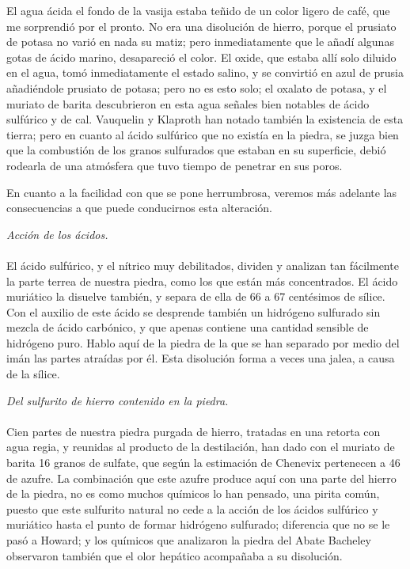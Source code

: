\documentclass[a4paper, 11pt, oneside, polutonikogreek, spanish]{article}
\begin{document}
El agua ácida el fondo de la vasija estaba teñido de un color ligero de café, que me sorprendió por el pronto. No era una disolución de hierro, porque el prusiato de potasa no varió en nada su matiz; pero inmediatamente que le añadí algunas gotas de ácido marino, desapareció el color. El oxide, que estaba allí solo diluido en el agua, tomó inmediatamente el estado salino, y se convirtió en azul de prusia añadiéndole prusiato de potasa; pero no es esto solo; el oxalato de potasa, y el muriato de barita descubrieron en esta agua señales bien notables de ácido sulfúrico y de cal. Vauquelin y Klaproth han notado también la existencia de esta tierra; pero en cuanto al ácido sulfúrico que no existía en la piedra, se juzga bien que la combustión de los granos sulfurados que estaban en su superficie, debió rodearla de una atmósfera que tuvo tiempo de penetrar en sus poros.

En cuanto a la facilidad con que se pone herrumbrosa, veremos más adelante las consecuencias a que puede conducirnos esta alteración.

\clearpage
\begin{center}
\emph{Acción de los ácidos.}
\end{center}
\paragraph{}
El ácido sulfúrico, y el nítrico muy debilitados, dividen y analizan tan fácilmente la parte terrea de nuestra piedra, como los que están más concentrados. El ácido muriático la disuelve también, y separa de ella de 66 a 67 centésimos de sílice. Con el auxilio de este ácido se desprende también un hidrógeno sulfurado sin mezcla de ácido carbónico, y que apenas contiene una cantidad sensible de hidrógeno puro. Hablo aquí de la piedra de la que se han separado por medio del imán las partes atraídas por él. Esta disolución forma a veces una jalea, a causa de la sílice.
\begin{center}
\emph{Del sulfurito de hierro contenido en la piedra.}
\end{center}
\paragraph{}
Cien partes de nuestra piedra purgada de hierro, tratadas en una retorta con agua regia, y reunidas al producto de la destilación, han dado con el muriato de barita 16 granos de sulfate, que según la estimación de Chenevix pertenecen a 46 de azufre. La combinación que este azufre produce aquí con una parte del hierro de la piedra, no es como muchos químicos lo han pensado, una pirita común, puesto que este sulfurito natural no cede a la acción de los ácidos sulfúrico y muriático hasta el punto de formar hidrógeno sulfurado; diferencia que no se le pasó a Howard; y los químicos que analizaron la piedra del Abate Bacheley observaron también que el olor hepático acompañaba a su disolución.
\end{document}
